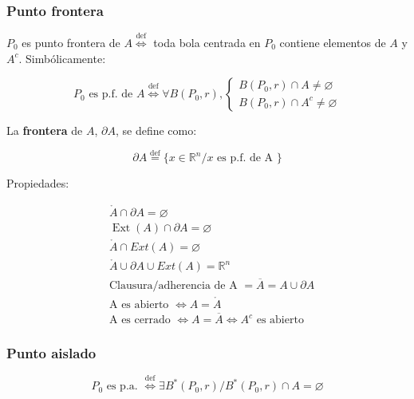 \documentclass{article}
\renewcommand{\Bbb}{\mathbb}
\begin{document}
\subsubsection{Punto frontera}

$P_0$ es punto frontera de $A \overset{\text{def}}{\Longleftrightarrow}$ toda bola centrada en $P_0$ contiene elementos de $A$ y $A^c$. Simbólicamente:

\begin{equation}
P_0 \text{ es p.f. de } A \overset{\text{def}}{\Longleftrightarrow} \forall B(P_0, r), \left\{
\begin{array}{ll}
B(P_0, r) \cap A \neq \varnothing \\
B(P_0, r) \cap A^c \neq \varnothing
\end{array}
\right.
\end{equation}

La \textbf{frontera} de $A$, $\partial A$, se define como:

\begin{equation}
\partial A \overset{\text{def}}{=} \{ x \in \Bbb R^n / x \text{ es p.f. de A } \}
\end{equation}

Propiedades:

\begin{subequations}
\begin{align}
& \mathring{A} \cap \partial A = \varnothing \\
& \mathop{Ext}(A) \cap \partial A = \varnothing \\
& \mathring{A} \cap Ext(A) = \varnothing \\
& \mathring{A} \cup \partial A \cup Ext(A) = \Bbb R^n \\
& \text{Clausura/adherencia de A } = \overline{A} = A \cup \partial A \\
& \text{A es abierto } \Longleftrightarrow A = \mathring{A} \\
& \text{A es cerrado } \Longleftrightarrow A = \overline{A} \Longleftrightarrow A^c \text{ es abierto }
\end{align}
\end{subequations}

\subsubsection{Punto aislado}

\begin{equation}
P_0 \text{ es p.a. } \overset{\text{def}}{\Longleftrightarrow} \exists B^*(P_0, r) / B^*(P_0, r) \cap A = \varnothing
\end{equation}
\end{document}
